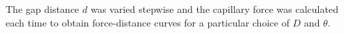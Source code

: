 \documentclass[english]{achemso}
\begin{document}
The gap distance $d$ was varied stepwise and the capillary force was
calculated each time to obtain force-distance curves for a particular
choice of $D$ and $\theta$. 

%
%
%
%
%
%
%
%
\end{document}
